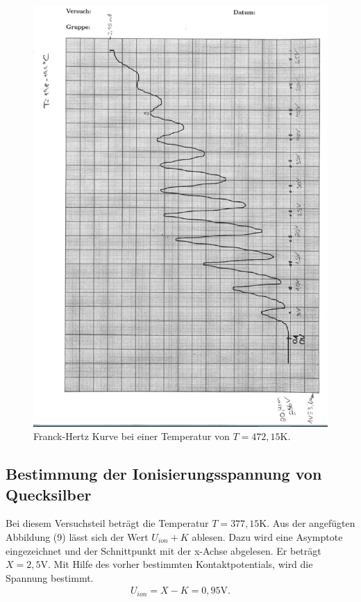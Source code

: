 \begin{figure}[H]
  \centering
  \includegraphics{FranckHertz.PNG}
  \caption{Franck-Hertz Kurve bei einer Temperatur von $T=472,15 \si{\K}$.}
  \label{fig:plot}
\end{figure}


\subsection{Bestimmung der Ionisierungsspannung von Quecksilber}
Bei diesem Versuchsteil beträgt die Temperatur $T= 377,15\si{\K}$.
Aus der angefügten Abbildung (9) lässt sich der Wert $U_{ion}+K$ ablesen.
Dazu wird eine Asymptote eingezeichnet und der Schnittpunkt mit der x-Achse abgelesen.
Er beträgt $X = 2,5 \si{\V}$. Mit Hilfe des vorher bestimmten Kontaktpotentials, wird die Spannung bestimmt.
\begin{align*}
U_{ion} = X-K = 0,95\si{\V}.
\end{align*}

